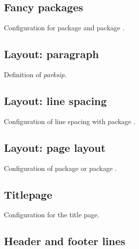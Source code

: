 \subsection{Fancy packages}

Configuration for package  and package .


\subsection{Layout: paragraph}

Definition of \emph{parksip}.


\subsection{Layout: line spacing}

Configuration of line spacing with package .


\subsection{Layout: page layout}

Configuration of package  or package .


\subsection{Titlepage}

Configuration for the title page.


\subsection{Header and footer lines}

